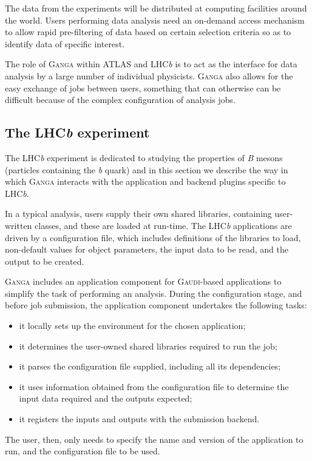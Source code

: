 \documentclass{elsart}
\def\lhcb {LHC{\em b\/}\xspace}
\def\atlas {ATLAS\xspace}
\def\ganga {\textsc{Ganga}\xspace}
\def\gaudi {\textsc{Gaudi}\xspace}
\begin{document}
The data from the experiments will be distributed at computing facilities
around the world. Users performing data analysis need an on-demand access
mechanism to allow rapid pre-filtering of data based on certain selection
criteria so as to identify data of specific interest.

The role of \ganga within \atlas and \lhcb is to act as the interface for data
analysis by a large number of individual physicists. \ganga also allows for
the easy exchange of jobs between users, something that can otherwise can be difficult
because of the complex configuration of analysis jobs.

\subsection{The \lhcb experiment}
\label{sec:lhcb}

The \lhcb experiment is dedicated to studying the properties of \textit{B}
mesons (particles containing the \textit{b} quark) and in this section we
describe the way in which \ganga interacts with the application and
backend plugins specific to \lhcb.

In a typical analysis, users supply their own shared libraries, containing
user-written classes, and these are loaded at run-time. 
The \lhcb applications are driven by a configuration file,
which includes definitions of the libraries to load, non-default values for
object parameters, the input data to be read, and the output to be created.

\ganga includes an application component for \gaudi-based applications to simplify
the task of performing an analysis. During the configuration stage, and before
job submission, the application component undertakes the following tasks:
\begin{itemize}
\item it locally sets up the environment for the chosen application;
\item it determines the user-owned shared libraries required to
  run the job;
\item it parses the configuration file supplied, including all its dependencies;
\item it uses information obtained from the configuration file to determine
  the input data required and the outputs expected;
\item it registers the inputs and outputs with the submission backend.
\end{itemize}
The user, then, only needs to specify the name and
version of the application to run, and the configuration file to be used.
\end{document}
